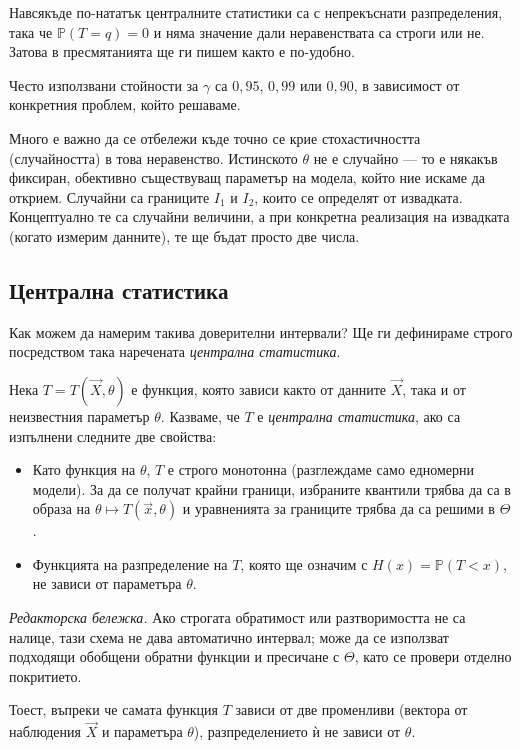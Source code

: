 \noindent
Навсякъде по-нататък централните статистики са с непрекъснати разпределения, така че
$\mathbb{P}(T = q) = 0$ и няма значение дали неравенствата са строги или не. Затова в
пресмятанията ще ги пишем както е по-удобно.

Често използвани стойности за $\gamma$ са $0{,}95$, $0{,}99$ или $0{,}90$, в зависимост от конкретния проблем, който решаваме.

Много е важно да се отбележи къде точно се крие стохастичността (случайността) в това неравенство. Истинското $\theta$ не е случайно — то е някакъв фиксиран, обективно съществуващ параметър на модела, който ние искаме да открием. Случайни са границите $I_1$ и $I_2$, които се определят от извадката. Концептуално те са случайни величини, а при конкретна реализация на извадката (когато измерим данните), те ще бъдат просто две числа.

\subsection{Централна статистика}
Как можем да намерим такива доверителни интервали? Ще ги дефинираме строго посредством така наречената \emph{централна статистика}.

\begin{defn}\label{def:pivot}
Нека $T = T(\vec{X}, \theta)$ е функция, която зависи както от данните $\vec{X}$, така и от неизвестния параметър $\theta$. Казваме, че $T$ е \emph{централна статистика}, ако са изпълнени следните две свойства:
\begin{itemize}
    \item[А)] Като функция на $\theta$, $T$ е строго монотонна (разглеждаме само едномерни модели). За да се получат крайни граници, избраните квантили трябва да са в образа на $\theta \mapsto T(\vec x,\theta)$ и уравненията за границите трябва да са решими в $\Theta$.
    \item[Б)] Функцията на разпределение на $T$, която ще означим с $H(x) = \mathbb{P}(T < x)$, не зависи от параметъра $\theta$.
\end{itemize}
\emph{Редакторска бележка.} Ако строгата обратимост или разтворимостта не са налице, тази схема не дава автоматично интервал; може да се използват подходящи обобщени обратни функции и пресичане с $\Theta$, като се провери отделно покритието.
\end{defn}

Тоест, въпреки че самата функция $T$ зависи от две променливи (вектора от наблюдения $\vec{X}$ и параметъра $\theta$), разпределението ѝ не зависи от $\theta$.

